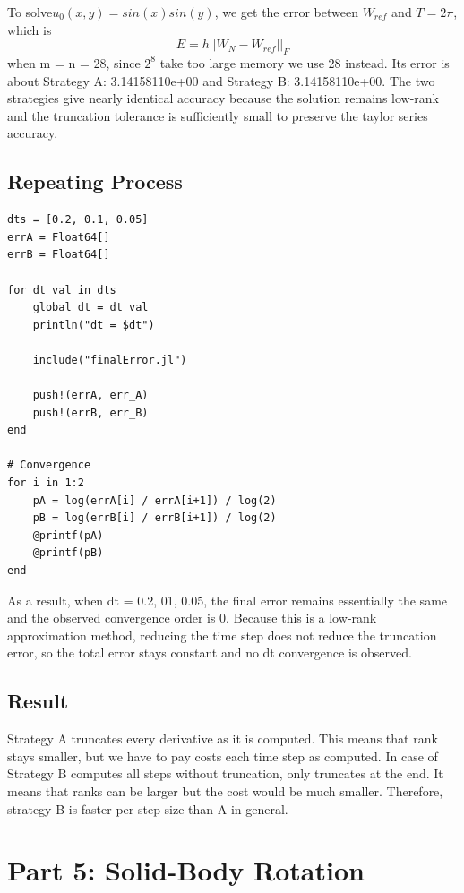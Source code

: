\documentclass[11pt]{report}
\begin{document}
To solve$ u_0(x,y) = sin(x)sin(y)$, we get the error between $W_{ref}$ and $T = 2\pi$, which is
\[
E = h||W_N - W_{ref}||_F 
\]
when m = n = 28, since $2^8$ take too large memory we use 28 instead. Its error is about Strategy A:  3.14158110e+00 and Strategy B:  3.14158110e+00. The two strategies give nearly identical accuracy because the solution remains low-rank and the truncation tolerance is sufficiently small to preserve the taylor series accuracy.

\subsection{Repeating Process}

\begin{lstlisting}
dts = [0.2, 0.1, 0.05]
errA = Float64[]
errB = Float64[]

for dt_val in dts
    global dt = dt_val
    println("dt = $dt")

    include("finalError.jl")

    push!(errA, err_A)
    push!(errB, err_B)
end

# Convergence
for i in 1:2
    pA = log(errA[i] / errA[i+1]) / log(2)
    pB = log(errB[i] / errB[i+1]) / log(2)
    @printf(pA)
    @printf(pB)
end
\end{lstlisting}

As a result, when dt = 0.2, 01, 0.05, the final error remains essentially the same and the observed convergence order is 0. Because this is a low‑rank approximation method, reducing the time step does not reduce the truncation error, so the total error stays constant and no dt convergence is observed.

\subsection{Result}

Strategy A truncates every derivative as it is computed. This means that rank stays smaller, but we have to pay costs each time step as computed. In case of Strategy B computes all steps without truncation, only truncates at the end. It means that ranks can be larger but the cost would be much smaller. Therefore, strategy B is faster per step size than A in general.

\section{Part 5: Solid-Body Rotation}
\end{document}
